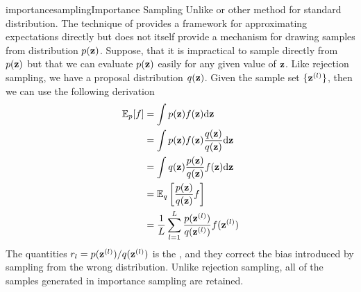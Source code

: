 \documentclass[9pt]{article}
\begin{document}
\begin{topic}{importancesampling}{Importance Sampling}
Unlike  or other  method for standard distribution.
The technique of  provides a framework for approximating expectations directly but does not itself provide a mechanism for drawing samples from distribution $p(\mathbf{z})$. Suppose, that it is impractical to sample directly from $p(\mathbf{z})$ but that we can evaluate $p(\mathbf{z})$ easily for any given value of $\mathbf{z}$. Like rejection sampling, we have a proposal distribution $q(\mathbf{z})$. Given the sample set $\{\mathbf{z}^{(l)}\}$, then we can use the following derivation
\[
\begin{split}
\operatorname{\mathbb{E}}_p[f] &= \int p(\mathbf{z})f(\mathbf{z}) \mathrm{d} \mathbf{z}\\
&= \int p(\mathbf{z})f(\mathbf{z}) \frac{q(\mathbf{z})}{q(\mathbf{z})}\mathrm{d} \mathbf{z}\\
&= \int q(\mathbf{z}) \frac{p(\mathbf{z})}{q(\mathbf{z})} f(\mathbf{z})\mathrm{d} \mathbf{z}\\
&= \operatorname{\mathbb{E}}_q\bigg[\frac{p(\mathbf{z})}{q(\mathbf{z})} f\bigg]\\
&= \frac{1}{L} \sum_{l=1}^{L}\frac{p(\mathbf{z}^{(l)})}{q(\mathbf{z}^{(l)})}f(\mathbf{z}^{(l)})
\end{split}
\]
The quantities $r_l = p(\mathbf{z}^{(l)})/q(\mathbf{z}^{(l)})$ is the , and they correct the bias introduced by sampling from the wrong distribution. Unlike rejection sampling, all of the samples generated in importance sampling are retained.


\end{topic}
\end{document}
